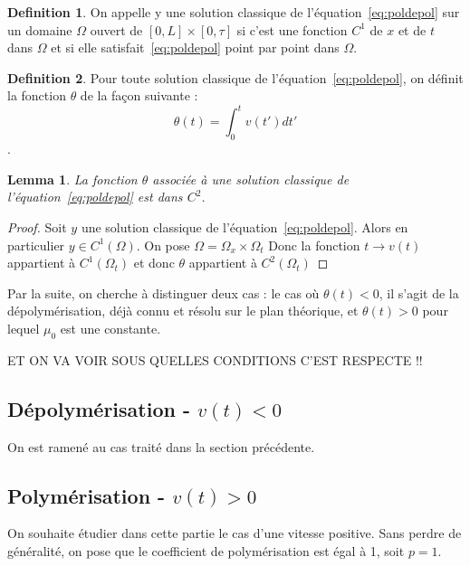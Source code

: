 \documentclass[a4paper]{article}
\newtheorem{lemma}[theorem]{Lemma}
\theoremstyle{definition}
\newtheorem{definition}{Definition}[section]
\theoremstyle{remark}
\newcommand{\pol}{p}
\begin{document}
\begin{definition}
	On appelle y une solution classique de l'équation~\eqref{eq:poldepol} 
	sur un domaine $\Omega$ ouvert de $[0,L] \times [0, \tau]$ 
	si c'est une fonction $C^1$ de $x$ et de $t$ dans $\Omega$ 
	et si elle satisfait~\eqref{eq:poldepol} point par point dans $\Omega$.
\end{definition}

\begin{definition} 
	Pour toute solution classique de l'équation~\eqref{eq:poldepol}, on définit la fonction $\theta$ de la façon suivante : 
	\[ \theta (t) = \int_0^tv(t')dt'\].
\end{definition}

\begin{lemma}
	La fonction $\theta$ associée à une solution classique de l'équation~\eqref{eq:poldepol} est dans $C^2$.
\end{lemma}

\begin{proof}
	Soit $y$ une solution classique de l'équation~\eqref{eq:poldepol}. Alors en particulier $y \in C^1(\Omega)$.
	On pose $\Omega = \Omega_x \times \Omega_t$ 
	Donc la fonction $t \to v(t)$ appartient à $C^1(\Omega_t)$ et donc $\theta$ appartient à $C^2(\Omega_t)$  
\end{proof}


Par la suite, on cherche à distinguer deux cas : 
le cas où $\theta(t)<0$, il s'agit de la dépolymérisation, 
déjà connu et résolu sur le plan théorique, 
et $\theta(t)>0$ pour lequel $\mu_0$ est une constante.

ET ON VA VOIR SOUS QUELLES CONDITIONS C'EST RESPECTE !!

\subsection{Dépolymérisation - $v(t) < 0$}

On est ramené au cas traité dans la section précédente.

\subsection{Polymérisation - $v(t) > 0$}

On souhaite étudier dans cette partie le cas d'une vitesse positive. 
Sans perdre de généralité, 
on pose que le coefficient de polymérisation est égal à 1, 
soit $\pol =1$.
\end{document}

